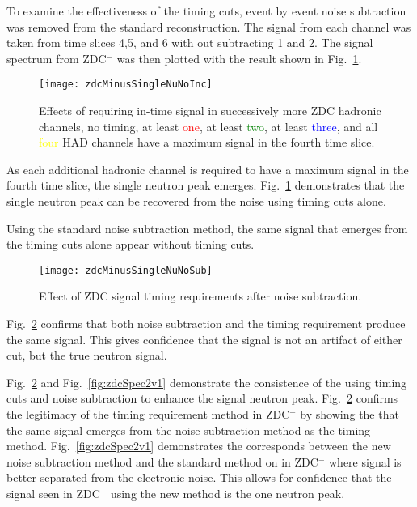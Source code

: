       To examine the effectiveness of the timing cuts, event by event noise 
        subtraction was removed from the standard reconstruction.
      The signal from each channel was taken from time slices 4,5, and 6 with
        out subtracting 1 and 2.
      The signal spectrum from ZDC$^{-}$ was then plotted with the result
        shown in Fig.~\ref{fig:zdcTimingCuts}.
      \begin{figure}[!Hhbt]
        \centering
        \texttt{[image: zdcMinusSingleNuNoInc]}
        \caption{Effects of requiring in-time signal in successively more 
          ZDC hadronic channels, no timing, at least \textcolor{red}{one}, at least \textcolor{green}{two},
            at least \textcolor{blue}{three}, and all \textcolor{yellow}{four} HAD channels have a maximum signal
            in the fourth time slice.}
        \label{fig:zdcTimingCuts}
      \end{figure}
      As each additional hadronic channel is required to have a maximum signal
        in the fourth time slice, the single neutron peak emerges. 
      Fig.~\ref{fig:zdcTimingCuts} demonstrates that the single neutron peak 
        can be recovered from the noise using timing cuts alone. 

      Using the standard noise subtraction method, the same signal that emerges
        from the timing cuts alone appear without timing cuts.
       \begin{figure}[h]
        \centering
        \texttt{[image: zdcMinusSingleNuNoSub]}
        \caption{Effect of ZDC signal timing requirements after noise 
          subtraction.}
        \label{fig:zdcTimingAfterNoiseSub}
      \end{figure}
      Fig.~\ref{fig:zdcTimingAfterNoiseSub} confirms that both noise 
        subtraction and the timing requirement produce the same signal.
      This gives confidence that the signal is not an artifact of either cut, 
        but the true neutron signal.

       Fig.~\ref{fig:zdcTimingAfterNoiseSub} and Fig.~\ref{fig:zdcSpec2v1} 
        demonstrate the consistence of the using timing cuts and noise 
        subtraction to enhance the signal neutron peak. 
      Fig.~\ref{fig:zdcTimingAfterNoiseSub} confirms the legitimacy of the 
        timing requirement method in ZDC$^{-}$ by showing the that the same
        signal emerges from the noise subtraction method as the timing method.
      Fig.~\ref{fig:zdcSpec2v1} demonstrates the corresponds between
        the new noise subtraction method and the standard method on in 
        ZDC$^{-}$ where signal is better separated from the electronic noise. 
      This allows for confidence that the signal seen in ZDC$^{+}$ using 
        the new method is the one neutron peak.
 
